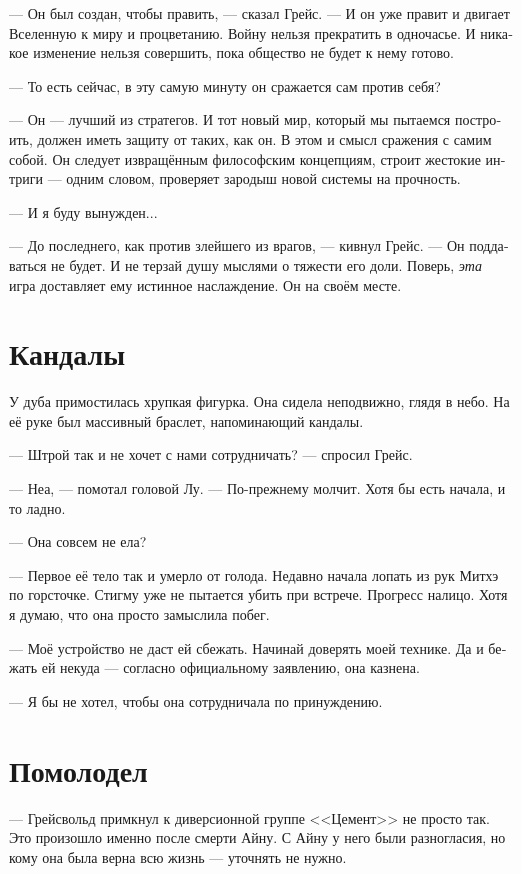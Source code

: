 \documentclass[a4paper,12pt,fleqn]{book}\usepackage{cooltooltips}\usepackage{polyglossia}\setdefaultlanguage[babelshorthands=true]{russian}\setotherlanguage{english}\defaultfontfeatures{Ligatures=TeX,Mapping=tex-text} \usepackage{xcolor}\definecolor{lightgray}{HTML}{bbbbbb}\color{lightgray}\newcommand{\ml}[3]{\textenglish{\textcolor{black}{#3}}}
\begin{document}
{--- Он был создан, чтобы править, --- сказал Грейс.
--- И он уже правит и двигает Вселенную к миру и процветанию.
Войну нельзя прекратить в одночасье.
И никакое изменение нельзя совершить, пока общество не будет к нему готово.

--- То есть сейчас, в эту самую минуту он сражается сам против себя?

--- Он --- лучший из стратегов.
И тот новый мир, который мы пытаемся построить, должен иметь защиту от таких, как он.
В этом и смысл сражения с самим собой.
Он следует извращённым философским концепциям, строит жестокие интриги --- одним словом, проверяет зародыш новой системы на прочность.

--- И я буду вынужден...

--- До последнего, как против злейшего из врагов, --- кивнул Грейс.
--- Он поддаваться не будет.
И не терзай душу мыслями о тяжести его доли.
Поверь, \emph{эта} игра доставляет ему истинное наслаждение.
Он на своём месте.

\section{Кандалы}

У дуба примостилась хрупкая фигурка.
Она сидела неподвижно, глядя в небо.
На её руке был массивный браслет, напоминающий кандалы.

--- Штрой так и не хочет с нами сотрудничать? --- спросил Грейс.

--- Неа, --- помотал головой Лу.
--- По-прежнему молчит.
Хотя бы есть начала, и то ладно.

--- Она совсем не ела?

--- Первое её тело так и умерло от голода.
Недавно начала лопать из рук Митхэ по горсточке.
Стигму уже не пытается убить при встрече.
Прогресс налицо.
Хотя я думаю, что она просто замыслила побег.

--- Моё устройство не даст ей сбежать.
Начинай доверять моей технике.
Да и бежать ей некуда --- согласно официальному заявлению, она казнена.

--- Я бы не хотел, чтобы она сотрудничала по принуждению.

\section{Помолодел}

--- Грейсвольд примкнул к диверсионной группе <<Цемент>> не просто так.
Это произошло именно после смерти Айну.
С Айну у него были разногласия, но кому она была верна всю жизнь --- уточнять не нужно.

}
\end{document}
